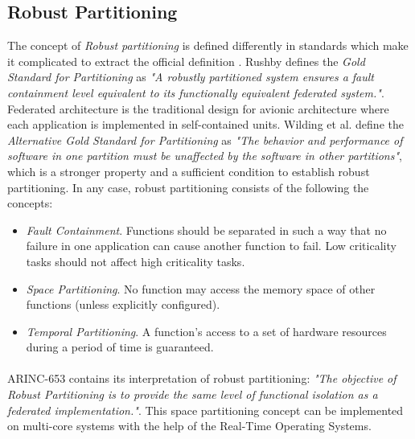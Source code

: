 \subsection{Robust Partitioning} 
The concept of \emph{Robust partitioning} is defined differently in standards which make it complicated to extract the official definition \cite{robustpartitioning}. Rushby \cite{goldenrule} defines the \emph{Gold Standard for Partitioning} as \emph{"A robustly partitioned system ensures a fault containment level equivalent to its functionally equivalent federated system."}. Federated architecture is the traditional design for avionic architecture where each application is implemented in self-contained units. Wilding et al.\cite{goldenruleinvariant} define the \emph{Alternative Gold Standard for Partitioning} as \emph{"The behavior and performance of software in one partition must be unaffected by the software in other partitions"}, which is a stronger property and a sufficient condition to establish robust partitioning. In any case, robust partitioning consists of the following the concepts:
\begin{itemize}
\item \emph{Fault Containment}. Functions should be separated in such a way that no failure in one application can cause another function to fail. Low criticality tasks should not affect high criticality tasks.
\item \emph{Space Partitioning}. No function may access the memory space of other functions (unless explicitly configured).
\item \emph{Temporal Partitioning}. A function's access to a set of hardware resources during a period of time is guaranteed.
\end{itemize}

\paragraph{} ARINC-653 contains its interpretation of robust partitioning: \emph{"The objective of Robust Partitioning is to provide the same level of functional isolation as a federated implementation."}. This space partitioning concept can be implemented on multi-core systems with the help of the Real-Time Operating Systems.

